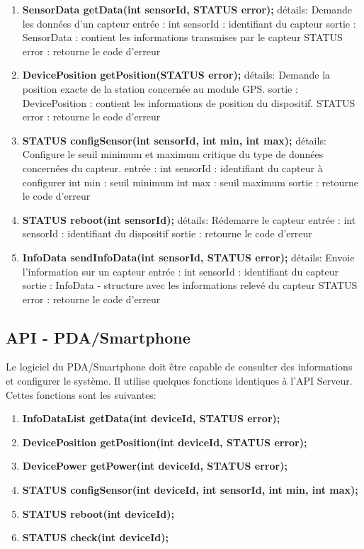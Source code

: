 \begin{enumerate}

\item \textbf{SensorData getData(int sensorId, STATUS error);}
détails:
		Demande les données d'un capteur
entrée : 
		int sensorId : identifiant du capteur
sortie :
		SensorData : contient les informations transmises par le capteur 
		STATUS error : retourne le code d'erreur

\item \textbf{DevicePosition getPosition(STATUS error);}
détails:
		Demande la position exacte de la station concernée au module GPS.
sortie :
		DevicePosition : contient les informations de position du dispositif.
		STATUS error : retourne le code d'erreur


\item \textbf{STATUS configSensor(int sensorId, int min, int max);}
détails:
		Configure le seuil minimum et maximum critique du type de données concernées du capteur.
entrée :
		int sensorId : identifiant du capteur à configurer
		int min : seuil minimum
		int max : seuil maximum
sortie :
		retourne le code d'erreur

\item \textbf{STATUS reboot(int sensorId);}
détails:
		Rédemarre le capteur
entrée :
		int sensorId : identifiant du dispositif
sortie :
		retourne le code d'erreur

\item \textbf{InfoData sendInfoData(int sensorId, STATUS error);}
détails:
		Envoie l'information sur un capteur
entrée : 
		int sensorId : identifiant du capteur
sortie :
		InfoData - structure avec les informations relevé du capteur
		STATUS error : retourne le code d'erreur

\end{enumerate}

\subsection{API - PDA/Smartphone}

Le logiciel du PDA/Smartphone doit être capable de consulter des informations et configurer le système. Il utilise quelques fonctions identiques à l'API Serveur. Cettes fonctions sont les suivantes:


\begin{enumerate}
\item \textbf{InfoDataList getData(int deviceId, STATUS error);}
\item \textbf{DevicePosition getPosition(int deviceId, STATUS error);}
\item \textbf{DevicePower getPower(int deviceId, STATUS error);}
\item \textbf{STATUS configSensor(int deviceId, int sensorId, int min, int max);}
\item \textbf{STATUS reboot(int deviceId);}
\item \textbf{STATUS check(int deviceId);}
\end{enumerate}
